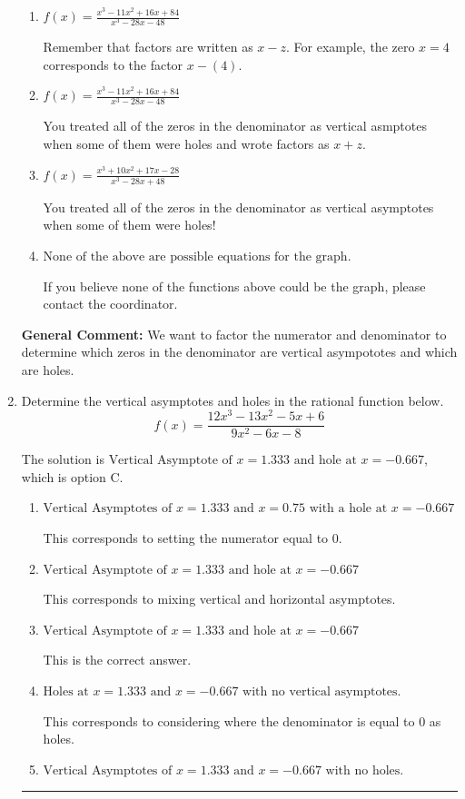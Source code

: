 \documentclass{extbook}[14pt]
\newcommand{\litem}[1]{\item #1

\rule{\textwidth}{0.4pt}}
\begin{document}
\begin{enumerate}
{\begin{enumerate}[label=\Alph*.]
This is the correct answer!
\item \( f(x)=\frac{x^{3} -11 x^{2} +16 x + 84}{x^{3} -28 x -48} \)

Remember that factors are written as $x-z$. For example, the zero $x=4$ corresponds to the factor $x-(4)$.
\item \( f(x)=\frac{x^{3} -11 x^{2} +16 x + 84}{x^{3} -28 x -48} \)

You treated all of the zeros in the denominator as vertical asmptotes when some of them were holes and wrote factors as $x+z$.
\item \( f(x)=\frac{x^{3} +10 x^{2} +17 x -28}{x^{3} -28 x + 48} \)

You treated all of the zeros in the denominator as vertical asymptotes when some of them were holes!
\item \( \text{None of the above are possible equations for the graph.} \)

If you believe none of the functions above could be the graph, please contact the coordinator.
\end{enumerate}

\textbf{General Comment:} We want to factor the numerator and denominator to determine which zeros in the denominator are vertical asympototes and which are holes.
}
\litem{
Determine the vertical asymptotes and holes in the rational function below.
\[ f(x) = \frac{12x^{3} -13 x^{2} -5 x + 6}{9x^{2} -6 x -8} \]

The solution is \( \text{Vertical Asymptote of } x = 1.333 \text{ and hole at } x = -0.667 \), which is option C.\begin{enumerate}[label=\Alph*.]
\item \( \text{Vertical Asymptotes of } x = 1.333 \text{ and } x = 0.75 \text{ with a hole at } x = -0.667 \)

This corresponds to setting the numerator equal to 0.
\item \( \text{Vertical Asymptote of } x = 1.333 \text{ and hole at } x = -0.667 \)

This corresponds to mixing vertical and horizontal asymptotes.
\item \( \text{Vertical Asymptote of } x = 1.333 \text{ and hole at } x = -0.667 \)

This is the correct answer.
\item \( \text{Holes at } x = 1.333 \text{ and } x = -0.667 \text{ with no vertical asymptotes.} \)

This corresponds to considering where the denominator is equal to 0 as holes.
\item \( \text{Vertical Asymptotes of } x = 1.333 \text{ and } x = -0.667 \text{ with no holes.} \)


\end{enumerate}}
\end{enumerate}
\end{document}
